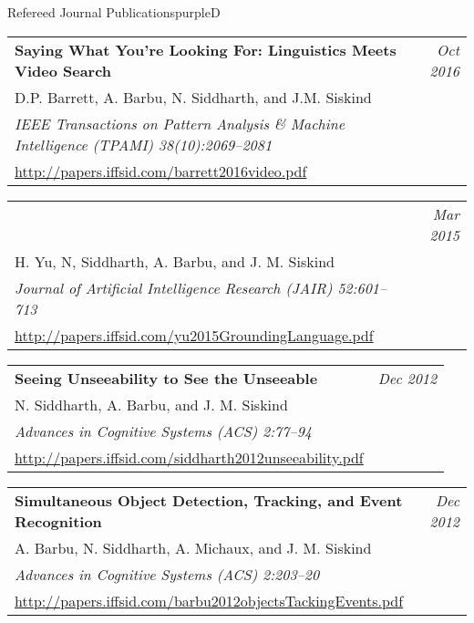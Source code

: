 \documentclass[a4paper]{article}
\makeatletter
\newlength{\itemtextwidth}
\newenvironment{publication}[5]
{ \item
  \begin{tabular*}{\itemtextwidth}{@{}p{5.6in}@{\extracolsep{\fill}}r@{}}
    \textbf{#1} & \textit{#2}\\ #3 &\\ \textit{#4}&\\ #5
  \end{tabular*}
  \vspace*{-2pt}
} {}
\def\item{\addtocounter{enumi}{-2}\oldItem}
\makeatother
\begin{document}
\begin{region}[J][4]{Refereed Journal Publications}{purpleD}
  \begin{publication} {Saying What You're Looking For: Linguistics Meets Video Search}
    {Oct 2016}
    {D.P. Barrett, A. Barbu, N. Siddharth, and J.M. Siskind}
    {IEEE Transactions on Pattern Analysis \& Machine Intelligence (TPAMI)
      \hfill \emph{38(10):2069--2081}}
    {\url{http://papers.iffsid.com/barrett2016video.pdf}}
  \end{publication}
  \begin{publication} {A Compositional Framework for Grounding Language Inference, Generation,
      and\rule{6ex}{0pt} Acquisition in Video}
    {Mar 2015}
    {H. Yu, N, Siddharth, A. Barbu, and J. M. Siskind}
    {Journal of Artificial Intelligence Research (JAIR) \hfill \emph{52:601--713}}
    {\url{http://papers.iffsid.com/yu2015GroundingLanguage.pdf}}
  \end{publication}
  \begin{publication} {Seeing Unseeability to See the Unseeable}
    {Dec 2012}
    {N. Siddharth, A. Barbu, and J. M. Siskind}
    {Advances in Cognitive Systems (ACS) \hfill \emph{2:77--94}}
    {\url{http://papers.iffsid.com/siddharth2012unseeability.pdf}\label{j:2}}
  \end{publication}
  \begin{publication} {Simultaneous Object Detection, Tracking, and Event Recognition}
    {Dec 2012}
    {A. Barbu, N. Siddharth, A. Michaux, and J. M. Siskind}
    {Advances in Cognitive Systems (ACS) \hfill \emph{2:203--20}}
    {\url{http://papers.iffsid.com/barbu2012objectsTackingEvents.pdf}\label{j:1}}
  \end{publication}
\end{region}
\end{document}

